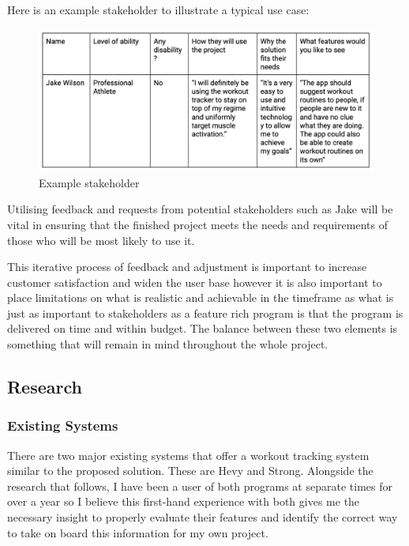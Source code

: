 \documentclass{article}
\begin{document}
Here is an example stakeholder to illustrate a typical use case:

\begin{figure}[ht]
  \centering
  \includegraphics[width=1\textwidth]{Figure 3.png}
  \caption{Example stakeholder}
\end{figure}

Utilising feedback and requests from potential stakeholders such as Jake will be vital in ensuring that the finished project meets the needs and requirements of those who will be most likely to use it.

This iterative process of feedback and adjustment is important to increase customer satisfaction and widen the user base however it is also important to place limitations on what is realistic and achievable in the timeframe as what is just as important to stakeholders as a feature rich program is that the program is delivered on time and within budget. The balance between these two elements is something that will remain in mind throughout the whole project. 

\subsection{Research}

\subsubsection{Existing Systems}
There are two major existing systems that offer a workout tracking system similar to the proposed solution. These are Hevy and Strong. Alongside the research that follows, I have been a user of both programs at separate times for over a year so I believe this first-hand experience with both gives me the necessary insight to properly evaluate their features and identify the correct way to take on board this information for my own project. 
\end{document}
